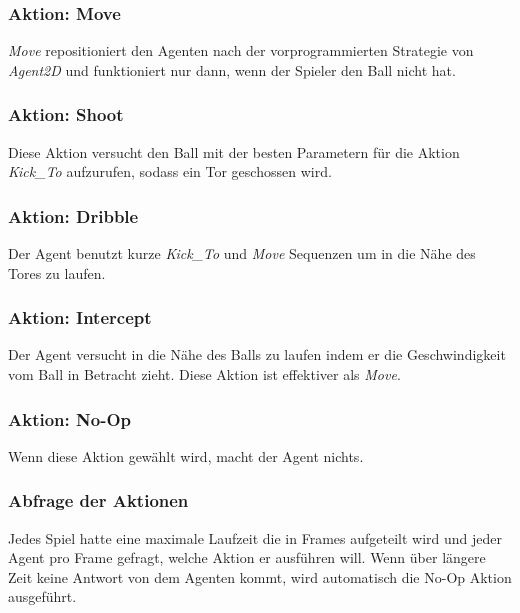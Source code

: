             \subsubsection*{Aktion: Move}
            \textit{Move} repositioniert den Agenten nach der vorprogrammierten Strategie von \textit{Agent2D} und funktioniert nur dann, wenn der Spieler den Ball nicht hat.

            \subsubsection*{Aktion: Shoot}
            Diese Aktion versucht den Ball mit der besten Parametern für die Aktion \textit{Kick\_To} aufzurufen, sodass ein Tor geschossen wird. 

            \subsubsection*{Aktion: Dribble}
            Der Agent benutzt kurze \textit{Kick\_To} und \textit{Move} Sequenzen um in die Nähe des Tores zu laufen.

            \subsubsection*{Aktion: Intercept}
            Der Agent versucht in die Nähe des Balls zu laufen indem er die Geschwindigkeit vom Ball in Betracht zieht. Diese Aktion ist effektiver als \textit{Move}.

            \subsubsection*{Aktion: No-Op}
            Wenn diese Aktion gewählt wird, macht der Agent nichts.

            \subsubsection*{Abfrage der Aktionen}
            Jedes Spiel hatte eine maximale Laufzeit die in Frames aufgeteilt wird und jeder Agent pro Frame gefragt, welche Aktion er ausführen will. Wenn über längere Zeit keine Antwort von dem Agenten kommt, wird automatisch die No-Op Aktion ausgeführt.


